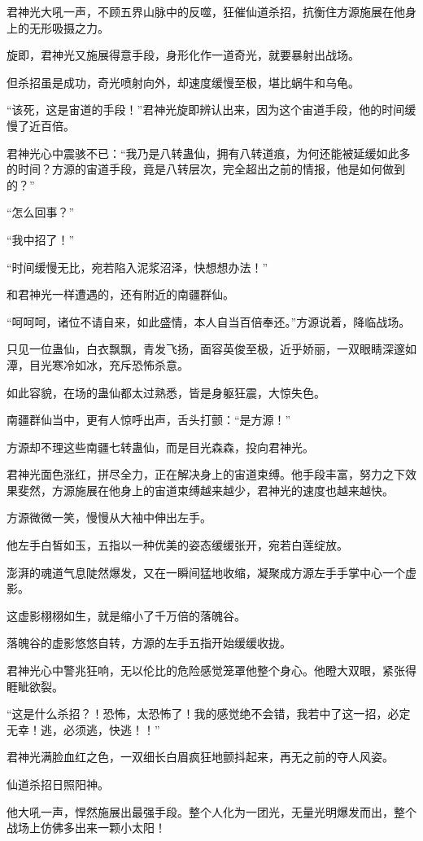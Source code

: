 \begin{this_body}
君神光大吼一声，不顾五界山脉中的反噬，狂催仙道杀招，抗衡住方源施展在他身上的无形吸摄之力。

旋即，君神光又施展得意手段，身形化作一道奇光，就要暴射出战场。

但杀招虽是成功，奇光喷射向外，却速度缓慢至极，堪比蜗牛和乌龟。

“该死，这是宙道的手段！”君神光旋即辨认出来，因为这个宙道手段，他的时间缓慢了近百倍。

君神光心中震骇不已：“我乃是八转蛊仙，拥有八转道痕，为何还能被延缓如此多的时间？方源的宙道手段，竟是八转层次，完全超出之前的情报，他是如何做到的？”

“怎么回事？”

“我中招了！”

“时间缓慢无比，宛若陷入泥浆沼泽，快想想办法！”

和君神光一样遭遇的，还有附近的南疆群仙。

“呵呵呵，诸位不请自来，如此盛情，本人自当百倍奉还。”方源说着，降临战场。

只见一位蛊仙，白衣飘飘，青发飞扬，面容英俊至极，近乎娇丽，一双眼睛深邃如潭，目光寒冷如冰，充斥恐怖杀意。

如此容貌，在场的蛊仙都太过熟悉，皆是身躯狂震，大惊失色。

南疆群仙当中，更有人惊呼出声，舌头打颤：“是方源！”

方源却不理这些南疆七转蛊仙，而是目光森森，投向君神光。

君神光面色涨红，拼尽全力，正在解决身上的宙道束缚。他手段丰富，努力之下效果斐然，方源施展在他身上的宙道束缚越来越少，君神光的速度也越来越快。

方源微微一笑，慢慢从大袖中伸出左手。

他左手白皙如玉，五指以一种优美的姿态缓缓张开，宛若白莲绽放。

澎湃的魂道气息陡然爆发，又在一瞬间猛地收缩，凝聚成方源左手手掌中心一个虚影。

这虚影栩栩如生，就是缩小了千万倍的落魄谷。

落魄谷的虚影悠悠自转，方源的左手五指开始缓缓收拢。

君神光心中警兆狂响，无以伦比的危险感觉笼罩他整个身心。他瞪大双眼，紧张得睚眦欲裂。

“这是什么杀招？！恐怖，太恐怖了！我的感觉绝不会错，我若中了这一招，必定无幸！逃，必须逃，快逃！！”

君神光满脸血红之色，一双细长白眉疯狂地颤抖起来，再无之前的夺人风姿。

仙道杀招日照阳神。

他大吼一声，悍然施展出最强手段。整个人化为一团光，无量光明爆发而出，整个战场上仿佛多出来一颗小太阳！


\end{this_body}
